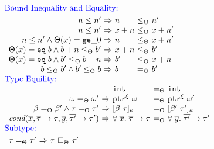 \begin{DIFnomarkup}
\begin{figure}
{\small
\[\hspace*{-1.2em}
\begin{array}{l}
\textcolor{blue}{\text{Bound Inequality and Equality:}}\\[0.3em]
  \begin{array}{r@{~}c@{~}l@{~}c@{~}l}
     n \le n' &\Rightarrow& n &\le_{\Theta} & n'\\
     n \le n' &\Rightarrow& x+n &\le_{\Theta} & x+n'\\
     n \le n' \wedge \Theta(x)=\tgez &\Rightarrow& n &\le_{\Theta} & x+n'\\
     \Theta(x)=\teq{b} \wedge b+n\le_{\Theta}b'  &\Rightarrow& x+n & \le_{\Theta} & b'\\
     \Theta(x)=\teq{b}\wedge b'\le_{\Theta}b+n  &\Rightarrow& b' & \le_{\Theta} & x+n\\
     b \le_{\Theta} b' \wedge b' \le_{\Theta} b  &\Rightarrow& b & =_{\Theta} & b'
    \end{array}
  \\[1.5em]
\textcolor{blue}{\text{Type Equility:}}\\
  \begin{array}{r@{~}c@{~}l@{~}c@{~}l}
     && \tint & =_{\Theta} & \tint\\
     \omega =_{\Theta} \omega' &\Rightarrow& \tptr{\omega}{\xi} & =_{\Theta} & \tptr{\omega'}{\xi}\\
     \bvar =_{\Theta} \bvar' \wedge  \tau =_{\Theta} \tau'
             &\Rightarrow& \tallarrayb{\bvar}{\tau} & =_{\Theta} & \tallarrayb{\bvar'}{\tau'}\\

    \textit{cond}(\overline{x},\overline{\tau}\to\tau,\overline{y},\overline{\tau'}\to\tau')

 &\Rightarrow& \tfun{\overline{x}}{\overline{\tau}}{\tau} & 
                         =_{\Theta} & \tfun{\overline{y}}{\overline{\tau'}}{\tau'}\\
    \end{array}
  \\[0.7em]
\textcolor{blue}{\text{Subtype:}}\\[0.3em]

  \begin{array}{r@{~}c@{~}l@{~}c@{~}l}
    \tau =_{\Theta} \tau'&\Rightarrow&\tau &\sqsubseteq_{\Theta}& \tau'\\[0.2em]


\end{array}
\end{array}\]}
\end{figure}
\end{DIFnomarkup}
